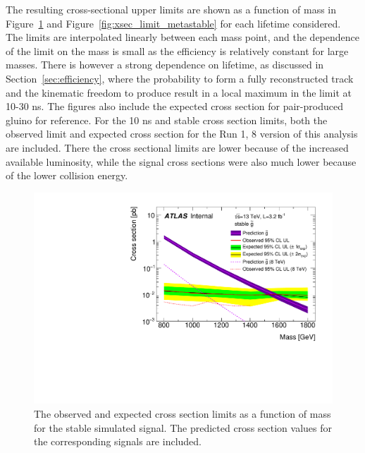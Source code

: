 The resulting cross-sectional upper limits are shown as a function of mass in Figure~\ref{fig:xsec_limit_stable} and Figure~\ref{fig:xsec_limit_metastable} for each lifetime considered.
The limits are interpolated linearly between each mass point, and the dependence of the limit on the mass is small as the efficiency is relatively constant for large \rhadron masses.
There is however a strong dependence on lifetime, as discussed in Section~\ref{sec:efficiency}, where the probability to form a fully reconstructed track and the kinematic freedom to produce \met result in a local maximum in the limit at 10-30 ns.
The figures also include the expected cross section for pair-produced gluino \rhadrons for reference.
For the 10 ns and stable cross section limits, both the observed limit and expected cross section for the Run 1, 8 \TeV version of this analysis are included.
There the cross sectional limits are lower because of the increased available luminosity, while the signal cross sections were also much lower because of the lower collision energy.

\begin{figure}
\begin{center}
  \includegraphics[width=\fullfig]{figures/xsec_limit_stable.pdf}
\end{center}
\label{fig:xsec_limit_stable}
\caption{The observed and expected cross section limits as a function of mass for the stable simulated signal. The predicted cross section values for the corresponding signals are included.}
\end{figure}

